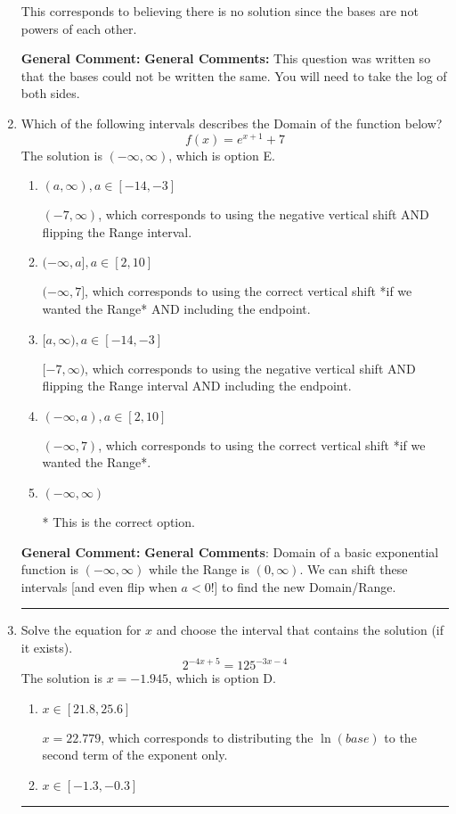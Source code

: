 \documentclass{extbook}[14pt]
\newcommand{\litem}[1]{\item #1

\rule{\textwidth}{0.4pt}}
\begin{document}
\begin{enumerate}
{\begin{enumerate}[label=\Alph*.]
This corresponds to believing there is no solution since the bases are not powers of each other.
\end{enumerate}

\textbf{General Comment:} \textbf{General Comments:} This question was written so that the bases could not be written the same. You will need to take the log of both sides.
}
\litem{
Which of the following intervals describes the Domain of the function below?
\[ f(x) = e^{x+1}+7 \]The solution is \( (-\infty, \infty) \), which is option E.\begin{enumerate}[label=\Alph*.]
\item \( (a, \infty), a \in [-14, -3] \)

$(-7, \infty)$, which corresponds to using the negative vertical shift AND flipping the Range interval.
\item \( (-\infty, a], a \in [2, 10] \)

$(-\infty, 7]$, which corresponds to using the correct vertical shift *if we wanted the Range* AND including the endpoint.
\item \( [a, \infty), a \in [-14, -3] \)

$[-7, \infty)$, which corresponds to using the negative vertical shift AND flipping the Range interval AND including the endpoint.
\item \( (-\infty, a), a \in [2, 10] \)

$(-\infty, 7)$, which corresponds to using the correct vertical shift *if we wanted the Range*.
\item \( (-\infty, \infty) \)

* This is the correct option.
\end{enumerate}

\textbf{General Comment:} \textbf{General Comments}: Domain of a basic exponential function is $(-\infty, \infty)$ while the Range is $(0, \infty)$. We can shift these intervals [and even flip when $a<0$!] to find the new Domain/Range.
}
\litem{
Solve the equation for $x$ and choose the interval that contains the solution (if it exists).
\[ 2^{-4x+5} = 125^{-3x-4} \]The solution is \( x = -1.945 \), which is option D.\begin{enumerate}[label=\Alph*.]
\item \( x \in [21.8, 25.6] \)

$x = 22.779$, which corresponds to distributing the $\ln(base)$ to the second term of the exponent only.
\item \( x \in [-1.3, -0.3] \)


\end{enumerate}}
\end{enumerate}
\end{document}
